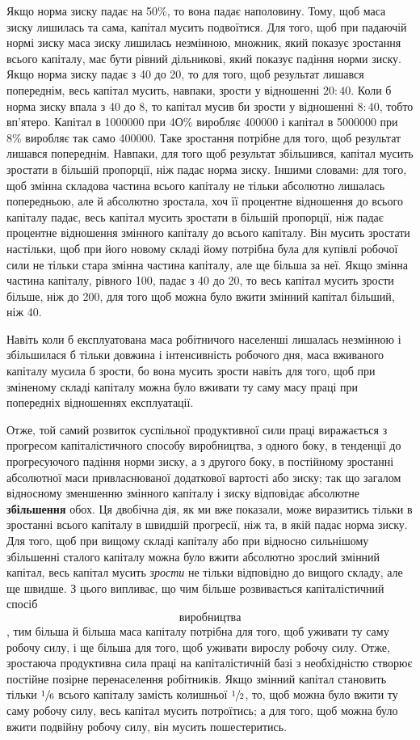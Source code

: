 \documentclass[12pt, a4paper, final]{memoir}
\begin{document}
Якщо норма зиску падає на 50\%, то вона падає наполовину. Тому, щоб маса зиску лишилась та сама, капітал мусить подвоїтися. Для того, щоб при падаючій нормі зиску маса зиску лишилась незмінною, множник, який показує зростання всього капіталу, має бути рівний дільникові, який показує падіння норми зиску. Якщо норма зиску падає з 40 до 20, то для того, щоб результат лишався попереднім, весь капітал мусить, навпаки, зрости у відношенні $20:40$. Коли б норма зиску впала з 40 до 8, то капітал мусив би зрости у відношенні $8:40$, тобто вп’ятеро. Капітал в 1000000 при 4О\% виробляє 400000 і капітал в 5000000 при 8\% виробляє так само 400000. Таке зростання потрібне для того, щоб результат лишався попереднім. Навпаки, для того щоб результат збільшився, капітал мусить зростати в більшій пропорції, ніж падає норма зиску. Іншими словами: для того, щоб змінна складова частина всього капіталу не тільки абсолютно лишалась попередньою, але й абсолютно зростала, хоч її процентне відношення до всього капіталу падає, весь капітал мусить зростати в більшій пропорції, ніж падає процентне відношення змінного капіталу до всього капіталу. Він мусить зростати настільки, щоб при його новому складі йому потрібна була для купівлі робочої сили не тільки стара змінна частина капіталу, але ще більша за неї. Якщо змінна частина капіталу, рівного 100, падає з 40 до 20, то весь капітал мусить зрости більше, ніж до 200, для того щоб можна було вжити змінний капітал більший, ніж 40.

Навіть коли б експлуатована маса робітничого населенші лишалась незмінною і збільшилася б тільки довжина і інтенсивність робочого дня, маса вживаного капіталу мусила б зрости, бо вона мусить зрости навіть для того, щоб при зміненому складі капіталу можна було вживати ту саму масу праці при попередніх відношеннях експлуатації.

Отже, той самий розвиток суспільної продуктивної сили праці виражається з прогресом капіталістичного способу виробництва, з одного боку, в тенденції до прогресуючого падіння норми зиску, а з другого боку, в постійному зростанні абсолютної маси привласнюваної додаткової вартості або зиску; так що загалом відносному зменшенню змінного капіталу і зиску відповідає абсолютне \textbf{збільшення} обох. Ця двобічна дія, як ми вже показали, може виразитись тільки в зростанні всього капіталу в швидшій прогресії, ніж та, в якій падає норма зиску. Для того, щоб при вищому складі капіталу або при відносно сильнішому збільшенні сталого капіталу можна було вжити абсолютно зрослий змінний капітал, весь капітал мусить \textit{зрости} не тільки відповідно до вищого складу, але ще швидше. З цього випливає, що чим більше розвивається капіталістичний спосіб 
\[виробництва\]
, тим більша й більша маса капіталу потрібна для того, щоб уживати ту саму робочу силу, і ще більша для того, щоб \(уживати\) вирослу робочу силу. Отже, зростаюча продуктивна сила праці на капіталістичній базі з необхідністю створює постійне позірне перенаселення робітників. Якщо змінний капітал становить тільки $\sfrac{1}{6}$ всього капіталу замість колишньої $\sfrac{1}{2}$, то, щоб можна було вжити ту саму робочу силу, весь капітал мусить потроїтись; а для того, щоб можна було вжити подвійну робочу силу, він мусить пошестеритись.
\end{document}
